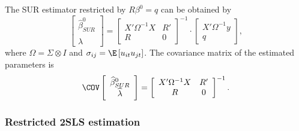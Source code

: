 The SUR estimator restricted by $R \beta^0 = q$ can be obtained by
\begin{equation}
   \left[ \begin{array}{c}
      \widehat{\beta}^0_{SUR} \\ \widehat{\lambda}
   \end{array} \right]
   =
   \left[ \begin{array}{cc}
      X' \Omega^{-1} X & R' \\ 
      R & 0
   \end{array} \right]^{-1}
   \cdot
   \left[ \begin{array}{c}
      X' \Omega^{-1} y \\ q 
   \end{array} \right] ,
\end{equation}
where $\Omega = \Sigma \otimes I$ and
$\sigma_{ij} = \E \left[ u_{it} u_{jt} \right]$.
The covariance matrix of the estimated parameters is
\begin{equation}
   \COV
   \left[ \begin{array}{c}
      \widehat{\beta}^0_{SUR} \\ \widehat{\lambda}
   \end{array} \right] 
   = 
   \left[ \begin{array}{cc}
      X' \Omega^{-1} X & R' \\ 
      R & 0
   \end{array} \right]^{-1} .
\end{equation}

\subsubsection{Restricted 2SLS estimation}

